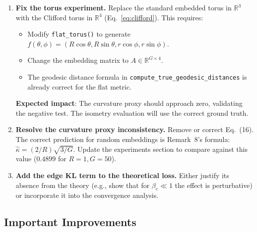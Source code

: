 \documentclass{article}
\newcommand{\RR}{\mathbb{R}}
\begin{document}
\begin{enumerate}[label=\textbf{F\arabic*.}]
    \item \textbf{Fix the torus experiment.}
      Replace the standard embedded torus in $\RR^3$ with the Clifford torus
      in $\RR^4$ (Eq.~\ref{eq:clifford}). This requires:
      \begin{itemize}
          \item Modify \texttt{flat\_torus()} to generate
            $f(\theta,\phi) = (R\cos\theta, R\sin\theta, r\cos\phi, r\sin\phi)$.
          \item Change the embedding matrix to $A \in \RR^{G \times 4}$.
          \item The geodesic distance formula in
            \texttt{compute\_true\_geodesic\_distances} is already correct for
            the flat metric.
      \end{itemize}
      \textbf{Expected impact}: The curvature proxy should approach zero,
      validating the negative test. The isometry evaluation will use the
      correct ground truth.

    \item \textbf{Resolve the curvature proxy inconsistency.}
      Remove or correct Eq.~(16). The correct prediction for random embeddings
      is Remark~8's formula: $\hat{\kappa} = (2/R)\sqrt{3/G}$. Update the
      experiments section to compare against this value ($0.4899$ for $R=1,
      G=50$).

    \item \textbf{Add the edge KL term to the theoretical loss.}
      Either justify its absence from the theory (e.g., show that for
      $\beta_e \ll 1$ the effect is perturbative) or incorporate it into the
      convergence analysis.
\end{enumerate}

\subsection{Important Improvements}
\end{document}
